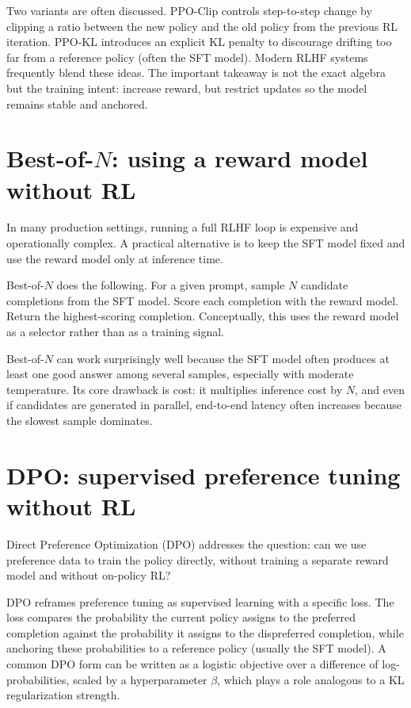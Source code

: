 Two variants are often discussed. PPO-Clip controls step-to-step change by clipping a ratio between the new policy and the old policy from the previous RL iteration. PPO-KL introduces an explicit KL penalty to discourage drifting too far from a reference policy (often the SFT model). Modern RLHF systems frequently blend these ideas. The important takeaway is not the exact algebra but the training intent: increase reward, but restrict updates so the model remains stable and anchored.

\section{Best-of-\(N\): using a reward model without RL}
In many production settings, running a full RLHF loop is expensive and operationally complex. A practical alternative is to keep the SFT model fixed and use the reward model only at inference time.

Best-of-\(N\) does the following. For a given prompt, sample \(N\) candidate completions from the SFT model. Score each completion with the reward model. Return the highest-scoring completion. Conceptually, this uses the reward model as a selector rather than as a training signal.

Best-of-\(N\) can work surprisingly well because the SFT model often produces at least one good answer among several samples, especially with moderate temperature. Its core drawback is cost: it multiplies inference cost by \(N\), and even if candidates are generated in parallel, end-to-end latency often increases because the slowest sample dominates.

\section{DPO: supervised preference tuning without RL}
Direct Preference Optimization (DPO) addresses the question: can we use preference data to train the policy directly, without training a separate reward model and without on-policy RL?

DPO reframes preference tuning as supervised learning with a specific loss. The loss compares the probability the current policy assigns to the preferred completion against the probability it assigns to the dispreferred completion, while anchoring these probabilities to a reference policy (usually the SFT model). A common DPO form can be written as a logistic objective over a difference of log-probabilities, scaled by a hyperparameter \(\beta\), which plays a role analogous to a KL regularization strength.

